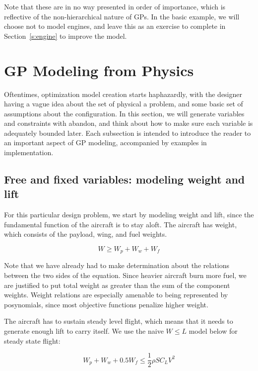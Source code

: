 Note that these are in no way presented in order of importance, which is reflective
of the non-hierarchical nature of \gls{GP}s.
In the basic example, we will choose not to model engines,
and leave this as an exercise
to complete in Section~\ref{s:engine} to improve the model.

\section{GP Modeling from Physics}

Oftentimes, optimization model creation starts haphazardly, with the designer having a
vague idea about the set of physical a problem, and some basic
set of assumptions about the configuration. In this section, we will
generate variables and constraints with abandon, and think about how to make
sure each variable is adequately bounded later. Each subsection is intended
to introduce the reader to an important aspect of \gls{GP} modeling,
accompanied by examples in implementation.

\subsection{Free and fixed variables: modeling weight and lift}
\label{s:wl}

For this particular design problem, we start by modeling
weight and lift, since the fundamental function of the aircraft is to stay aloft.
The aircraft has weight, which consists of the payload, wing, and fuel weights. 

\begin{equation}
    W \geq W_p + W_w + W_f
\end{equation}

Note that we have already had to make determination about the relations between
the two sides of the equation. Since heavier aircraft burn more fuel, we are justified
to put total weight as greater than the sum of the component weights. Weight relations
are especially amenable to being represented by posynomials, since most objective
functions penalize higher weight.

The aircraft has to sustain steady level flight, which means
that it needs to generate enough lift to carry itself. We use the naive $W \leq L$ 
model below for steady state flight:

\begin{equation}
    W_p + W_w + 0.5 W_f \leq \frac{1}{2} \rho S C_L V^2
\end{equation}

